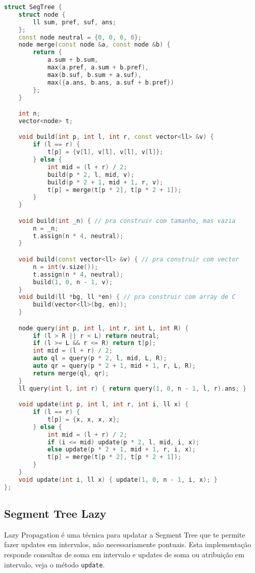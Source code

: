 \documentclass[10pt, a4paper, oneside]{book}
\begin{document}
\begin{lstlisting}[language=C++]
struct SegTree {
    struct node {
        ll sum, pref, suf, ans;
    };
    const node neutral = {0, 0, 0, 0};
    node merge(const node &a, const node &b) {
        return {
            a.sum + b.sum,
            max(a.pref, a.sum + b.pref),
            max(b.suf, b.sum + a.suf),
            max({a.ans, b.ans, a.suf + b.pref})
        };
    }

    int n;
    vector<node> t;

    void build(int p, int l, int r, const vector<ll> &v) {
        if (l == r) {
            t[p] = {v[l], v[l], v[l], v[l]};
        } else {
            int mid = (l + r) / 2;
            build(p * 2, l, mid, v);
            build(p * 2 + 1, mid + 1, r, v);
            t[p] = merge(t[p * 2], t[p * 2 + 1]);
        }
    }

    void build(int _n) { // pra construir com tamanho, mas vazia
        n = _n;
        t.assign(n * 4, neutral);
    }

    void build(const vector<ll> &v) { // pra construir com vector
        n = int(v.size());
        t.assign(n * 4, neutral);
        build(1, 0, n - 1, v);
    }
    void build(ll *bg, ll *en) { // pra construir com array de C
        build(vector<ll>(bg, en));
    }

    node query(int p, int l, int r, int L, int R) {
        if (l > R || r < L) return neutral;
        if (l >= L && r <= R) return t[p];
        int mid = (l + r) / 2;
        auto ql = query(p * 2, l, mid, L, R);
        auto qr = query(p * 2 + 1, mid + 1, r, L, R);
        return merge(ql, qr);
    }
    ll query(int l, int r) { return query(1, 0, n - 1, l, r).ans; }

    void update(int p, int l, int r, int i, ll x) {
        if (l == r) {
            t[p] = {x, x, x, x};
        } else {
            int mid = (l + r) / 2;
            if (i <= mid) update(p * 2, l, mid, i, x);
            else update(p * 2 + 1, mid + 1, r, i, x);
            t[p] = merge(t[p * 2], t[p * 2 + 1]);
        }
    }
    void update(int i, ll x) { update(1, 0, n - 1, i, x); }
};\end{lstlisting}
\hfill

\subsection{Segment Tree Lazy}


Lazy Propagation é uma técnica para updatar a Segment Tree que te permite fazer updates em intervalos, não necessariamente pontuais. Esta implementação responde consultas de soma em intervalo e updates de soma ou atribuição em intervalo, veja o método \texttt{update}.
\end{document}
